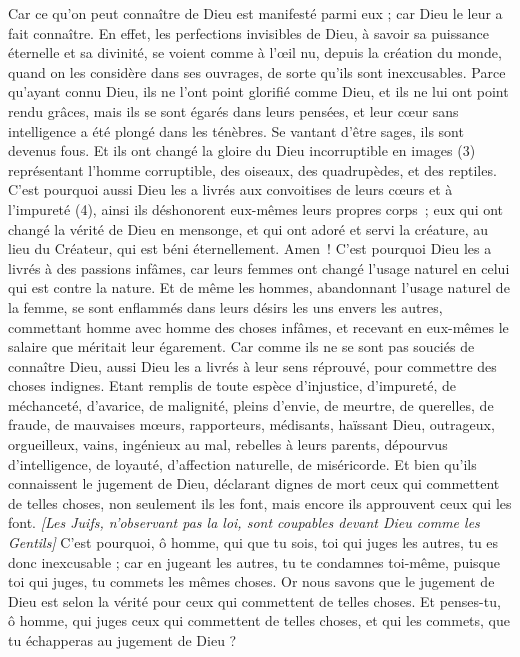 \begin{multicols}{2}
Car ce qu’on peut connaître de Dieu est manifesté parmi eux ; car Dieu le leur a fait connaître.
En effet, les perfections invisibles de Dieu, à savoir sa puissance éternelle et sa divinité, se voient comme à l’œil nu, depuis la création du monde, quand on les considère dans ses ouvrages, de sorte qu'ils sont inexcusables.
Parce qu'ayant connu Dieu, ils ne l'ont point glorifié comme Dieu, et ils ne lui ont point rendu grâces, mais ils se sont égarés dans leurs pensées, et leur cœur sans intelligence a été plongé dans les ténèbres.
Se vantant d’être sages, ils sont devenus fous.
Et ils ont changé la gloire du Dieu incorruptible en images (3) représentant l'homme corruptible, des oiseaux, des quadrupèdes, et des reptiles.
C'est pourquoi aussi Dieu les a livrés aux convoitises de leurs cœurs et à l’impureté (4), ainsi ils déshonorent eux-mêmes leurs propres corps ;
eux qui ont changé la vérité de Dieu en mensonge, et qui ont adoré et servi la créature, au lieu du Créateur, qui est béni éternellement. Amen !
C'est pourquoi Dieu les a livrés à des passions infâmes, car leurs femmes ont changé l'usage naturel en celui qui est contre la nature.
Et de même les hommes, abandonnant l'usage naturel de la femme, se sont enflammés dans leurs désirs les uns envers les autres, commettant homme avec homme des choses infâmes, et recevant en eux-mêmes le salaire que méritait leur égarement.
Car comme ils ne se sont pas souciés de connaître Dieu, aussi Dieu les a livrés à leur sens réprouvé, pour commettre des choses indignes.
Etant remplis de toute espèce d’injustice, d'impureté, de méchanceté, d'avarice, de malignité, pleins d'envie, de meurtre, de querelles, de fraude, de mauvaises mœurs,
rapporteurs, médisants, haïssant Dieu, outrageux, orgueilleux, vains, ingénieux au mal, rebelles à leurs parents,
dépourvus d’intelligence, de loyauté, d’affection naturelle, de miséricorde.
Et bien qu'ils connaissent le jugement de Dieu, déclarant dignes de mort ceux qui commettent de telles choses, non seulement ils les font, mais encore ils approuvent ceux qui les font.
\textit{[Les Juifs, n'observant pas la loi, sont coupables devant Dieu comme les Gentils]}
\VerseOne{}C'est pourquoi, ô homme, qui que tu sois, toi qui juges les autres, tu es donc inexcusable ; car en jugeant les autres, tu te condamnes toi-même, puisque toi qui juges, tu commets les mêmes choses.
Or nous savons que le jugement de Dieu est selon la vérité pour ceux qui commettent de telles choses.
Et penses-tu, ô homme, qui juges ceux qui commettent de telles choses, et qui les commets, que tu échapperas au jugement de Dieu ?

\end{multicols}
